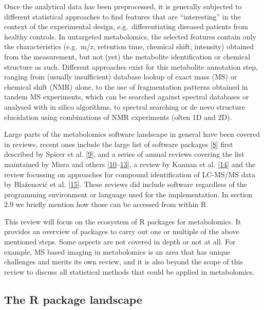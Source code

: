 \documentclass[]{article}
\begin{document}
Once the analytical data has been preprocessed, it is generally subjected to different statistical approaches to find features that are ``interesting'' in the context of the experimental design, e.g.~differentiating diseased patients from healthy controls.
In untargeted metabolomics, the selected features contain only the characteristics (e.g.~m/z, retention time, chemical shift, intensity) obtained from the measurement, but not (yet) the metabolite identification or chemical structure as such. Different approaches exist for this metabolite annotation step, ranging from (usually insufficient) database lookup of exact mass (MS) or chemical shift (NMR) alone, to the use of fragmentation patterns obtained in tandem MS experiments, which can be searched against spectral databases or analysed with in silico algorithms, to spectral searching or de novo structure elucidation using combinations of NMR experiments (often 1D and 2D).

Large parts of the metabolomics software landscape in general have been covered in reviews, recent ones include the large list of software packages {[}\protect\hyperlink{ref-spicer_website_2018}{8}{]} first described by Spicer et al. {[}\protect\hyperlink{ref-spicer_2017}{9}{]}, and a series of annual reviews covering the list maintained by Misra and others {[}\protect\hyperlink{ref-misra_2016}{10}--\protect\hyperlink{ref-misra_website_2017}{13}{]}, a review by Kannan et al. {[}\protect\hyperlink{ref-kannan_2016}{14}{]} and the review focussing on approaches for compound identification of LC-MS/MS data by Blaženović et al. {[}\protect\hyperlink{ref-blaenovi_2018}{15}{]}. These reviews did include software regardless of the programming environment or language used for the implementation. In section 2.9 we briefly mention how those can be accessed from within R.

This review will focus on the ecosystem of R packages for metabolomics. It provides an overview of packages to carry out one or multiple of the above mentioned steps. Some aspects are not covered in depth or not at all. For example, MS based imaging in metabolomics is an area that has unique challenges and merits its own review, and it is also beyond the scope of this review to discuss all statistical methods that could be applied in metabolomics.

\newpage

\hypertarget{the-r-package-landscape}{%
\subsection{The R package landscape}\label{the-r-package-landscape}}
\end{document}
